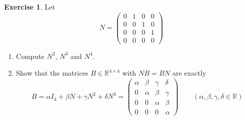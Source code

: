 \documentclass[12pt]{article}
\newcommand{\R}{\mathbb R}
\theoremstyle{definition}
\newtheorem{exercise}{Exercise}
\begin{document}
\begin{exercise}\label{r1-ex-commuting}
Let
\[
N=\begin{pmatrix}0&1&0&0\\0&0&1&0\\0&0&0&1\\0&0&0&0\end{pmatrix}
\]
\begin{enumerate}
\item Compute \(N^2\), \(N^3\) and \(N^4\).
\item Show that the matrices \(B\in\R^{4\times4}\) with \(NB=BN\) are exactly
\[
B=\alpha I_4+\beta N+\gamma N^2+\delta N^3
=\begin{pmatrix}\alpha&\beta&\gamma&\delta\\0&\alpha&\beta&\gamma\\0&0&\alpha&\beta\\0&0&0&\alpha\end{pmatrix}
\qquad(\alpha,\beta,\gamma,\delta\in\R)
\]
\end{enumerate}
\end{exercise}
\end{document}
